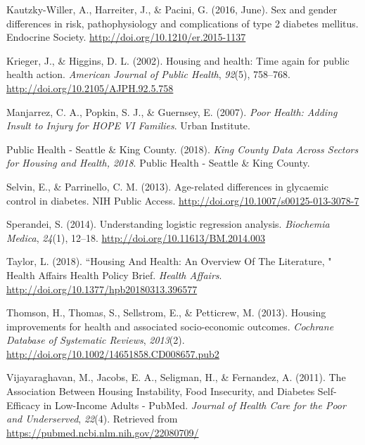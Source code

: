 \documentclass [11pt, proquest] {uwthesis}[2015/03/03]
\begin{document}
\hypertarget{ref-Kautzky-Willer2016}{}
Kautzky-Willer, A., Harreiter, J., \& Pacini, G. (2016, June). Sex and
gender differences in risk, pathophysiology and complications of type 2
diabetes mellitus. Endocrine Society.
\url{http://doi.org/10.1210/er.2015-1137}

\hypertarget{ref-Krieger2002}{}
Krieger, J., \& Higgins, D. L. (2002). Housing and health: Time again
for public health action. \emph{American Journal of Public Health},
\emph{92}(5), 758--768. \url{http://doi.org/10.2105/AJPH.92.5.758}

\hypertarget{ref-Manjarrez2007}{}
Manjarrez, C. A., Popkin, S. J., \& Guernsey, E. (2007). \emph{Poor
Health: Adding Insult to Injury for HOPE VI Families}. Urban Institute.

\hypertarget{ref-PHSKC2018}{}
Public Health - Seattle \& King County. (2018). \emph{King County Data
Across Sectors for Housing and Health, 2018}. Public Health - Seattle \&
King County.

\hypertarget{ref-Selvin2013}{}
Selvin, E., \& Parrinello, C. M. (2013). Age-related differences in
glycaemic control in diabetes. NIH Public Access.
\url{http://doi.org/10.1007/s00125-013-3078-7}

\hypertarget{ref-Sperandei2014}{}
Sperandei, S. (2014). Understanding logistic regression analysis.
\emph{Biochemia Medica}, \emph{24}(1), 12--18.
\url{http://doi.org/10.11613/BM.2014.003}

\hypertarget{ref-Taylor2018}{}
Taylor, L. (2018). ``Housing And Health: An Overview Of The Literature,
" Health Affairs Health Policy Brief. \emph{Health Affairs}.
\url{http://doi.org/10.1377/hpb20180313.396577}

\hypertarget{ref-Thomson2013}{}
Thomson, H., Thomas, S., Sellstrom, E., \& Petticrew, M. (2013). Housing
improvements for health and associated socio-economic outcomes.
\emph{Cochrane Database of Systematic Reviews}, \emph{2013}(2).
\url{http://doi.org/10.1002/14651858.CD008657.pub2}

\hypertarget{ref-Vijayaraghavan2011}{}
Vijayaraghavan, M., Jacobs, E. A., Seligman, H., \& Fernandez, A.
(2011). The Association Between Housing Instability, Food Insecurity,
and Diabetes Self-Efficacy in Low-Income Adults - PubMed. \emph{Journal
of Health Care for the Poor and Underserved}, \emph{22}(4). Retrieved
from \url{https://pubmed.ncbi.nlm.nih.gov/22080709/}
\end{document}
